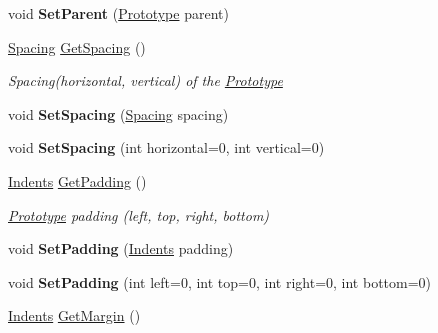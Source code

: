 \begin{DoxyCompactItemize}
\mbox{\label{class_space_v_i_l_1_1_prototype_a3814d1b4d892698231abf8db38e3c0c7}} 
void {\bfseries Set\+Parent} (\mbox{\hyperlink{class_space_v_i_l_1_1_prototype}{Prototype}} parent)
\item 
\mbox{\hyperlink{struct_space_v_i_l_1_1_decorations_1_1_spacing}{Spacing}} \mbox{\hyperlink{class_space_v_i_l_1_1_prototype_a615a4bdc121cb4a4e93d3c25ecb2bb35}{Get\+Spacing}} ()
\begin{DoxyCompactList}\small\item\em Spacing(horizontal, vertical) of the \mbox{\hyperlink{class_space_v_i_l_1_1_prototype}{Prototype}} \end{DoxyCompactList}\item 
\mbox{\label{class_space_v_i_l_1_1_prototype_a857f1c5c7d85c1a4ded748af4228099f}} 
void {\bfseries Set\+Spacing} (\mbox{\hyperlink{struct_space_v_i_l_1_1_decorations_1_1_spacing}{Spacing}} spacing)
\item 
\mbox{\label{class_space_v_i_l_1_1_prototype_ad6ef3f9120ecc69438d1e43950648ce5}} 
void {\bfseries Set\+Spacing} (int horizontal=0, int vertical=0)
\item 
\mbox{\hyperlink{struct_space_v_i_l_1_1_decorations_1_1_indents}{Indents}} \mbox{\hyperlink{class_space_v_i_l_1_1_prototype_a861ce67e320359dc1bf36a68b2a039b4}{Get\+Padding}} ()
\begin{DoxyCompactList}\small\item\em \mbox{\hyperlink{class_space_v_i_l_1_1_prototype}{Prototype}} padding (left, top, right, bottom) \end{DoxyCompactList}\item 
\mbox{\label{class_space_v_i_l_1_1_prototype_a0fd3389bccf866272a9e655c70a04a8a}} 
void {\bfseries Set\+Padding} (\mbox{\hyperlink{struct_space_v_i_l_1_1_decorations_1_1_indents}{Indents}} padding)
\item 
\mbox{\label{class_space_v_i_l_1_1_prototype_ac841170beb27ea4e265d7a1b545a2401}} 
void {\bfseries Set\+Padding} (int left=0, int top=0, int right=0, int bottom=0)
\item 
\mbox{\hyperlink{struct_space_v_i_l_1_1_decorations_1_1_indents}{Indents}} \mbox{\hyperlink{class_space_v_i_l_1_1_prototype_aff828c5a3ba3253b301f93ecdb8e4876}{Get\+Margin}} ()

\end{DoxyCompactItemize}
